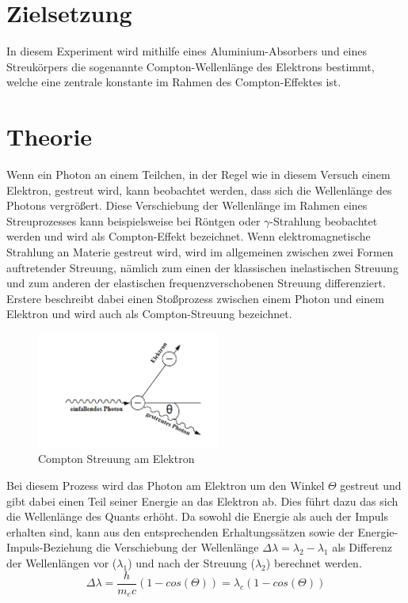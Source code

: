 \section{Zielsetzung}
In diesem Experiment wird mithilfe eines Aluminium-Absorbers und eines Streukörpers die sogenannte Compton-Wellenlänge des Elektrons bestimmt, welche eine zentrale konstante im Rahmen des Compton-Effektes ist.
\section{Theorie}
Wenn ein Photon an einem Teilchen, in der Regel wie in diesem Versuch einem Elektron, gestreut wird, kann beobachtet werden, dass sich die Wellenlänge des Photons vergrößert. Diese Verschiebung der Wellenlänge im Rahmen eines Streuprozesses kann beispielsweise bei Röntgen oder $\gamma$-Strahlung beobachtet werden und wird als Compton-Effekt bezeichnet.
Wenn elektromagnetische Strahlung an Materie gestreut wird, wird im allgemeinen zwischen zwei Formen auftretender Streuung, nämlich zum einen der klassischen inelastischen Streuung und zum anderen der elastischen frequenzverschobenen Streuung differenziert. Erstere beschreibt dabei einen Stoßprozess zwischen einem Photon und einem Elektron und wird auch als Compton-Streuung bezeichnet.
\begin{figure} [h]
    \centering
    \includegraphics[width=6cm, keepaspectratio]{Compton Effekt}
    \caption{Compton Streuung am Elektron}
    \label{fig:Compton}
 \end{figure}
Bei diesem Prozess wird das Photon am Elektron um den Winkel $\Theta$ gestreut und gibt dabei einen Teil seiner Energie an das Elektron ab. Dies führt dazu das sich die Wellenlänge des Quants erhöht. Da sowohl die Energie als auch der Impuls erhalten sind, kann aus den entsprechenden Erhaltungssätzen sowie der Energie-Impuls-Beziehung die Verschiebung der Wellenlänge $\Delta \lambda=\lambda_2-\lambda _1$ als Differenz der Wellenlängen vor ($\lambda_1$) und nach der Streuung ($\lambda_2$) berechnet werden.
\begin{equation}
\Delta \lambda=\frac{h}{m_ec}(1-cos(\Theta))=\lambda_c(1-cos(\Theta))
\end{equation}
